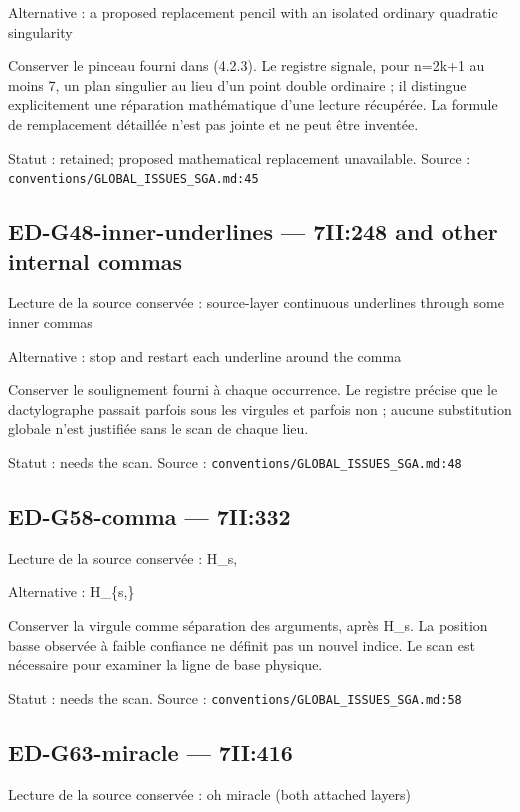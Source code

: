 Alternative : a proposed replacement pencil with an isolated ordinary quadratic singularity

Conserver le pinceau fourni dans (4.2.3). Le registre signale, pour n=2k+1 au moins 7, un plan singulier au lieu d’un point double ordinaire ; il distingue explicitement une réparation mathématique d’une lecture récupérée. La formule de remplacement détaillée n’est pas jointe et ne peut être inventée.

Statut : retained; proposed mathematical replacement unavailable. Source : \nolinkurl{conventions/GLOBAL_ISSUES_SGA.md:45}

\subsection*{ED-G48-inner-underlines — 7II:248 and other internal commas}

Lecture de la source conservée : source-layer continuous underlines through some inner commas

Alternative : stop and restart each underline around the comma

Conserver le soulignement fourni à chaque occurrence. Le registre précise que le dactylographe passait parfois sous les virgules et parfois non ; aucune substitution globale n’est justifiée sans le scan de chaque lieu.

Statut : needs the scan. Source : \nolinkurl{conventions/GLOBAL_ISSUES_SGA.md:48}

\subsection*{ED-G58-comma — 7II:332}

Lecture de la source conservée : H\_s,

Alternative : H\_\{s,\}

Conserver la virgule comme séparation des arguments, après H\_s. La position basse observée à faible confiance ne définit pas un nouvel indice. Le scan est nécessaire pour examiner la ligne de base physique.

Statut : needs the scan. Source : \nolinkurl{conventions/GLOBAL_ISSUES_SGA.md:58}

\subsection*{ED-G63-miracle — 7II:416}

Lecture de la source conservée : oh miracle (both attached layers)

